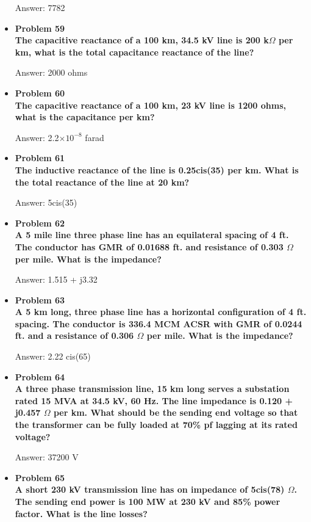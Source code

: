 \documentclass{article}
\begin{document}
\begin{center}
\begin{itemize}
    Answer: 7782

    \item\textbf{Problem 59\\%
    The capacitive reactance of a 100 km, 34.5 kV line is 200 k$\Omega$ per km, what is the total capacitance reactance of the line?}

    Answer: 2000 ohms

    \item\textbf{Problem 60\\%
    The capacitive reactance of a 100 km, 23 kV line is 1200 ohms, what is the capacitance per km?}

    Answer: 2.2$\times10^{-8}$ farad

    \item\textbf{Problem 61\\%
    The inductive reactance of the line is 0.25cis(35) per km. What is the total reactance of the line at 20 km?}

    Answer: 5cis(35)

    \item\textbf{Problem 62\\%
    A 5 mile line three phase line has an equilateral spacing of 4 ft. The conductor has GMR of 0.01688 ft. and resistance of 0.303 $\Omega$ per mile. What is the impedance?}

    Answer: 1.515 + j3.32

    \item \textbf{Problem 63\\%
    A 5 km long, three phase line has a horizontal configuration of 4 ft. spacing. The conductor is 336.4 MCM ACSR with GMR of 0.0244 ft. and  a resistance of 0.306 $\Omega$ per mile. What is the impedance?}

    Answer: 2.22 cis(65)

    \item\textbf{Problem 64\\%
    A three phase transmission line, 15 km long serves a substation rated 15 MVA at 34.5 kV, 60 Hz. The line impedance is 0.120 + j0.457 $\Omega$ per km. What should be the sending end voltage so that the transformer can be fully loaded at 70\% pf lagging at its rated voltage?}

    Answer: 37200 V

    \item\textbf{Problem 65\\%
    A short 230 kV transmission line has on impedance of 5cis(78) $\Omega$. The sending end power is 100 MW at 230 kV and 85\% power factor. What is the line losses?}


\end{itemize}
\end{center}
\end{document}
